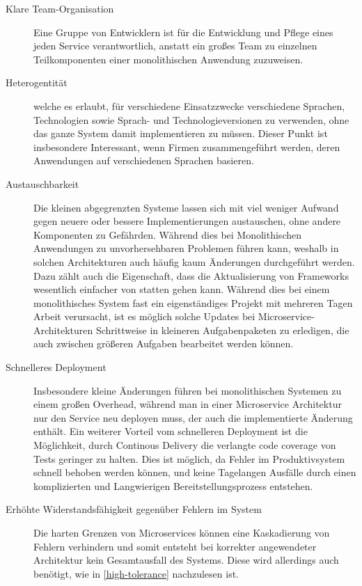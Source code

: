 \documentclass[12pt,a4paper,bibliography=totocnumbered,listof=totocnumbered]{scrartcl}
\begin{document}
\begin{description}
	
	\item[Klare Team-Organisation] Eine Gruppe von Entwicklern ist für die Entwicklung und Pflege eines jeden Service verantwortlich, anstatt ein großes Team zu einzelnen Teilkomponenten einer monolithischen Anwendung zuzuweisen.
	
	\item[Heterogentität] welche es erlaubt, für verschiedene Einsatzzwecke verschiedene Sprachen, Technologien sowie Sprach- und Technologieversionen zu verwenden, ohne das ganze System damit implementieren zu müssen. Dieser Punkt ist insbesondere Interessant, wenn Firmen zusammengeführt werden, deren Anwendungen auf verschiedenen Sprachen basieren.
	
	\item[Austauschbarkeit] Die kleinen abgegrenzten Systeme lassen sich mit viel weniger Aufwand gegen neuere oder bessere Implementierungen austauschen, ohne andere Komponenten zu Gefährden. Während dies bei Monolithischen Anwendungen zu unvorhersehbaren Problemen führen kann, weshalb in solchen Architekturen auch häufig kaum Änderungen durchgeführt werden. Dazu zählt auch die Eigenschaft, dass die Aktualisierung von Frameworks wesentlich einfacher von statten gehen kann. Während dies bei einem monolithisches System fast ein eigenständiges Projekt mit mehreren Tagen Arbeit verursacht, ist es möglich solche Updates bei Microservice-Architekturen Schrittweise in kleineren Aufgabenpaketen zu erledigen, die auch zwischen größeren Aufgaben bearbeitet werden können.
	
	\item[Schnelleres Deployment] Insbesondere kleine Änderungen führen bei monolithischen Systemen zu einem großen Overhead, während man in einer Microservice Architektur nur den Service neu deployen muss, der auch die implementierte Änderung enthält. Ein weiterer Vorteil vom schnelleren Deployment ist die Möglichkeit, durch Continous Delivery die verlangte code coverage von Tests geringer zu halten. Dies ist möglich, da Fehler im Produktivsystem schnell behoben werden können, und keine Tagelangen Ausfälle durch einen komplizierten und Langwierigen Bereitstellungsprozess entstehen.
	
	\item[Erhöhte Widerstandsfähigkeit gegenüber Fehlern im System] Die harten Grenzen von Microservices können eine Kaskadierung von Fehlern verhindern und somit entsteht bei korrekter angewendeter Architektur kein Gesamtausfall des Systems. Diese wird allerdings auch benötigt, wie in \ref{high-tolerance} nachzulesen ist. 
	

\end{description}
\end{document}
